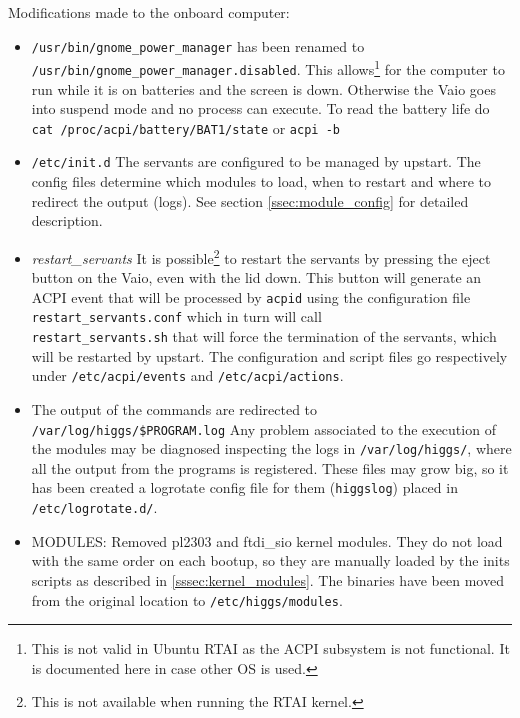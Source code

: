 Modifications made to the onboard computer:
\begin{itemize}
  \item \texttt{/usr/bin/gnome\_power\_manager} has been renamed to \\
    \texttt{/usr/bin/gnome\_power\_manager.disabled}.
   This allows\footnote{This is not valid in Ubuntu RTAI as the ACPI subsystem is not functional. It is documented here in case other OS is used.} for the computer to run while it is on batteries and the screen is down.
   Otherwise the Vaio goes into suspend mode and no process can execute.
   To read the battery life do \\ \texttt{cat /proc/acpi/battery/BAT1/state} or
   \texttt{acpi -b}
 \item \texttt{/etc/init.d} The servants are configured to be managed by upstart. The config files determine which modules to load, when to restart and where to redirect the output (logs). See section \ref{ssec:module_config} for detailed description.
 \item \emph{restart\_servants} It is possible\footnote{This is not available when running the RTAI kernel.} to restart the servants by
   pressing the eject button on the Vaio, even with the lid down. This button
   will generate an ACPI event that will be processed by \texttt{acpid} using
   the configuration file \texttt{restart\_servants.conf} which in turn will
   call \\ \texttt{restart\_servants.sh} that will force the termination of the
   servants, which will be restarted by upstart. The
   configuration and script files go respectively under
   \texttt{/etc/acpi/events} and \texttt{/etc/acpi/actions}.
 \item The output of the commands are redirected to \\
   \texttt{/var/log/higgs/\$PROGRAM.log}
   Any problem associated to the execution of the modules may be diagnosed
   inspecting the logs in \texttt{/var/log/higgs/}, where all the output from the
   programs is registered. These files may grow big, so it has been created a
   logrotate config file for them (\texttt{higgslog}) placed in \texttt{/etc/logrotate.d/}.
\item MODULES: Removed pl2303 and ftdi\_sio kernel modules. They do not load with
   the same order on each bootup, so they are manually loaded by the inits scripts as described in \ref{sssec:kernel_modules}.
   The binaries have been moved from the original location to \texttt{/etc/higgs/modules}.
\end{itemize}


